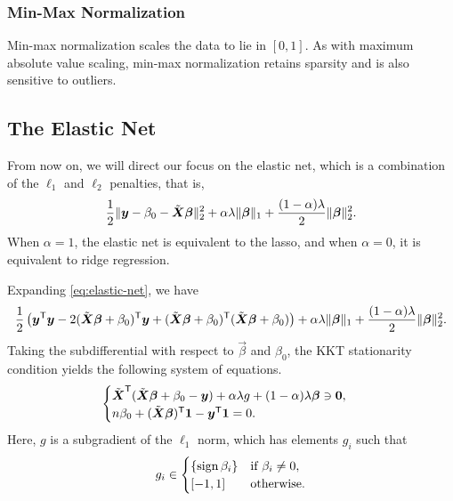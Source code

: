 \subsubsection{Min-Max Normalization}

Min-max normalization scales the data to lie in \([0, 1]\). As with maximum absolute value scaling, min-max normalization retains sparsity and is also sensitive to outliers.

\subsection{The Elastic Net}

From now on, we will direct our focus on the elastic net, which is a combination of the \(\ell_1\) and \(\ell_2\) penalties, that is,
\begin{equation}
  \label{eq:elastic-net}
  \frac{1}{2} \lVert \boldsymbol y - \beta_0 - \tilde{\boldsymbol{X}}\boldsymbol{\beta} \rVert^2_2  + \alpha\lambda \lVert \boldsymbol\beta \rVert_1 + \frac{(1 - \alpha)\lambda}{2}\lVert \boldsymbol \beta \rVert_2^2.
\end{equation}
When \(\alpha = 1\), the elastic net is equivalent to the lasso, and when \(\alpha = 0\), it is equivalent to ridge regression.

Expanding \eqref{eq:elastic-net}, we have
\[
  \begin{aligned}
    \frac{1}{2}\left( \boldsymbol y^{\mathsf{T}} \boldsymbol y - 2(\tilde{\boldsymbol{X}}\boldsymbol{\beta} + \beta_0)^{\mathsf{T}}\boldsymbol{y} + (\tilde{\boldsymbol{X}}\boldsymbol{\beta} + \beta_0)^{\mathsf{T}}(\tilde{\boldsymbol{X}}\boldsymbol{\beta} + \beta_0)\right) + \alpha\lambda \lVert \boldsymbol\beta \rVert_1 + \frac{(1 - \alpha)\lambda}{2}\lVert \boldsymbol \beta \rVert_2^2.
  \end{aligned}
\]
Taking the subdifferential with respect to \(\vec{\beta}\) and \(\beta_0\), the KKT stationarity condition yields the following system of equations.
\begin{equation}
  \label{eq:kkt-elasticnet}
  \begin{cases}
    \tilde{\boldsymbol{X}}^{\mathsf{T}}(\tilde{\boldsymbol{X}}\boldsymbol{\beta} + \beta_0 - \boldsymbol{y}) + \alpha\lambda g + (1 - \alpha)\lambda \boldsymbol\beta \ni \boldsymbol{0}, \\
    n \beta_0 + (\tilde{\boldsymbol{X}}\boldsymbol{\beta})^{\mathsf{T}} \boldsymbol{1} - \boldsymbol{y}^{\mathsf{T}} \boldsymbol{1} = 0.
  \end{cases}
\end{equation}
Here, \(g\) is a subgradient of the \(\ell_1\) norm, which has elements \(g_i\) such that
\[
  g_i \in
  \begin{cases}
    \{\operatorname{sign}{\beta_i}\} & \text{if } \beta_i \neq 0, \\
    [-1, 1]            & \text{otherwise}.
  \end{cases}
\]


